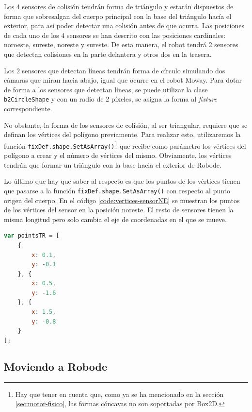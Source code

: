 Los 4 sensores de colisión tendrán forma de triángulo y estarán dispuestos de forma que sobresalgan del cuerpo principal con la base del triángulo hacía el exterior, para así poder detectar una colisión antes de que ocurra. Las posiciones de cada uno de los 4 sensores se han descrito con las posiciones cardinales: noroeste, sureste, noreste y sureste. De esta manera, el robot tendrá 2 sensores que detectan colisiones en la parte delantera y otros dos en la trasera. 

Los 2 sensores que detectan líneas tendrán forma de círculo simulando dos cámaras que miran hacia abajo, igual que ocurre en el robot Moway. Para dotar de forma a los sensores que detectan líneas, se puede utilizar la clase \texttt{b2CircleShape} y con un radio de 2 píxeles, se asigna la forma al \emph{fixture} correspondiente.

No obstante, la forma de los sensores de colisión, al ser triangular, requiere que se definan los vértices del polígono previamente.  Para realizar esto, utilizaremos la función \texttt{fixDef.shape.SetAsArray()}\footnote{Hay que tener en cuenta que, como ya se ha mencionado en la sección \ref{sec:motor-fisico}, las formas cóncavas no son soportadas por Box2D.} que recibe como parámetro los vértices del polígono a crear y el número de vértices del mismo. Obviamente, los vértices tendrán que formar un triángulo con la base hacia el exterior de Robode.

Lo último que hay que saber al respecto es que los puntos de los vértices tienen que pasarse a la función \texttt{fixDef.shape.SetAsArray()} con respecto al punto origen del cuerpo. En el código \ref{code:vertices-sensorNE} se muestran los puntos de los vértices del sensor en la posición noreste. El resto de sensores tienen la misma longitud pero solo cambia el eje de coordenadas en el que se mueve.

\begin{lstlisting}[language={Javascript},label={code:vertices-sensorNE}, caption={Vértices que forman el triángulo del sensor noreste de Robode.}]
var pointsTR = [
	{
	    x: 0.1,
	    y: -0.1
	}, {
	    x: 0.5,
	    y: -1.6
	}, {
	    x: 1.5,
	    y: -0.8
	}
];
\end{lstlisting}



\subsection{Moviendo a Robode}
\label{moviendo-robode}


